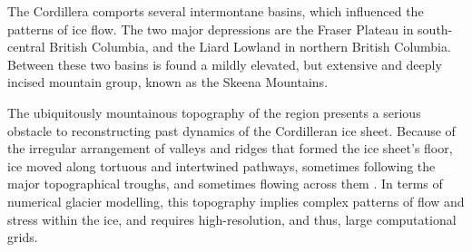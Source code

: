 \documentclass{article}
\begin{document}
The Cordillera comports several intermontane basins, which influenced the
patterns of ice flow. The two major depressions are the Fraser Plateau in
south-central British Columbia, and the Liard Lowland in northern British
Columbia. Between these two basins is found a mildly elevated, but extensive
and deeply incised mountain group, known as the Skeena Mountains.

The ubiquitously mountainous topography of the region presents a serious
obstacle to reconstructing past dynamics of the Cordilleran ice sheet. Because
of the irregular arrangement of valleys and ridges that formed the ice sheet's
floor, ice moved along tortuous and intertwined pathways, sometimes following
the major topographical troughs, and sometimes flowing across them
\citep{Davis.Mathews.1944, Kleman.etal.2010}. In terms of numerical glacier
modelling, this topography implies complex patterns of flow and stress
within the ice, and requires high-resolution, and thus, large computational
grids.
\end{document}
